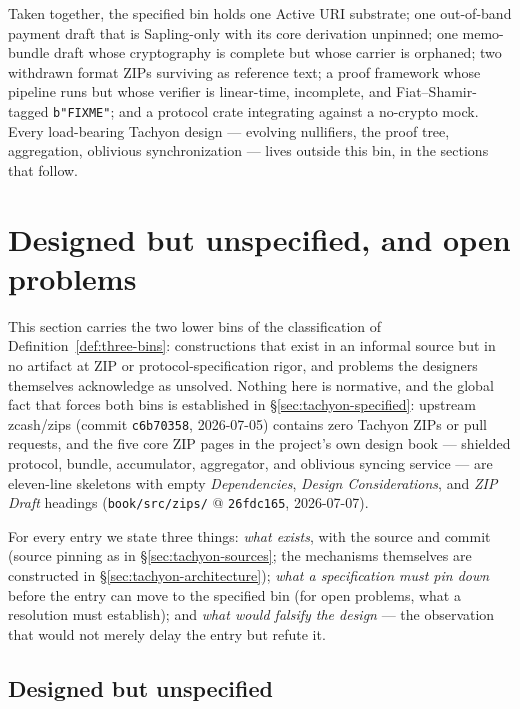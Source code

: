\documentclass[11pt,a4paper]{article}
\theoremstyle{definition}
\begin{document}
\medskip
\noindent
Taken together, the specified bin holds one Active URI substrate; one
out-of-band payment draft that is Sapling-only with its core derivation
unpinned; one memo-bundle draft whose cryptography is complete but whose
carrier is orphaned; two withdrawn format ZIPs surviving as reference text;
a proof framework whose pipeline runs but whose verifier is linear-time,
incomplete, and Fiat--Shamir-tagged \texttt{b"FIXME"}; and a protocol crate
integrating against a no-crypto mock. Every load-bearing Tachyon design ---
evolving nullifiers, the proof tree, aggregation, oblivious
synchronization --- lives outside this bin, in the sections that follow.

\section{Designed but unspecified, and open problems}\label{sec:tachyon-unspecified}

This section carries the two lower bins of the classification of
Definition~\ref{def:three-bins}: constructions that exist in an informal
source but in no artifact at ZIP or protocol-specification rigor, and
problems the designers themselves acknowledge as unsolved. Nothing here is
normative, and the global fact that forces both bins is established in
\S\ref{sec:tachyon-specified}: upstream \textsf{zcash/zips} (commit
\texttt{c6b70358}, 2026-07-05) contains zero Tachyon ZIPs or pull requests,
and the five core ZIP pages in the project's own design book --- shielded
protocol, bundle, accumulator, aggregator, and oblivious syncing service ---
are eleven-line skeletons with empty \emph{Dependencies}, \emph{Design
Considerations}, and \emph{ZIP Draft} headings (\texttt{book/src/zips/} @
\texttt{26fdc165}, 2026-07-07).

For every entry we state three things: \emph{what exists}, with the source
and commit (source pinning as in \S\ref{sec:tachyon-sources}; the mechanisms
themselves are constructed in \S\ref{sec:tachyon-architecture}); \emph{what
a specification must pin down} before the entry can move to the specified
bin (for open problems, what a resolution must establish); and \emph{what
would falsify the design} --- the observation that would not merely delay
the entry but refute it.

\subsection{Designed but unspecified}\label{sec:tachyon-dbu}
\end{document}
